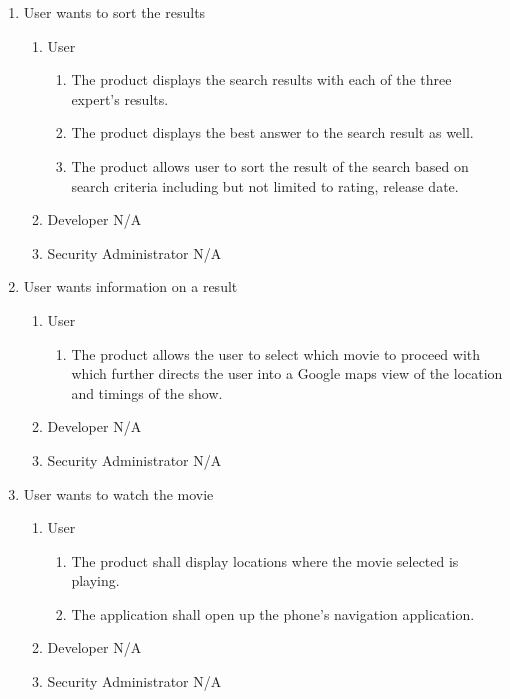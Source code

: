 \documentclass[]{article}
\begin{document}
\begin{enumerate}[{BE}1.]
	\item User wants to sort the results
	\begin{enumerate}[{VP2}.1]
		\item User
			\begin{enumerate}
				\item The product displays the search results with each of the three expert’s results.
				\item The product displays the best answer to the search result as well.
				\item The product allows user to sort the result of the search based on search criteria including but not limited to rating, release date.
			\end{enumerate}
		\item Developer
		\newline N/A
		\item Security Administrator
		\newline N/A
	\end{enumerate}
	\item User wants information on a result
	\begin{enumerate}[{VP3}.1]
		\item User
			\begin{enumerate}
				\item The product allows the user to select which movie to proceed with which further directs the user into a Google maps view of the location and timings of the show.
			\end{enumerate}
		\item Developer
		\newline N/A
		\item Security Administrator
		\newline N/A
	\end{enumerate}
	
	\item User wants to watch the movie
	\begin{enumerate}[{VP4}.1]
		\item User
			\begin{enumerate}
				\item The product shall display locations where the movie selected is playing.
				\item The application shall open up the phone’s navigation application.
			\end{enumerate}
		\item Developer
		\newline N/A
		\item Security Administrator
		\newline N/A
	\end{enumerate}
	

\end{enumerate}
\end{document}
